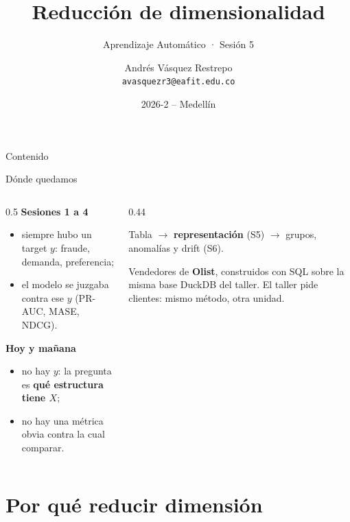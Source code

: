 \documentclass[aspectratio=169,12pt]{beamer}
\title[Reducción de dimensionalidad]{Reducción de dimensionalidad}
\subtitle{Aprendizaje Automático · Sesión 5}
\author[Aprendizaje Automático]{Andrés Vásquez Restrepo\\[2pt]{\normalfont\small\texttt{avasquezr3@eafit.edu.co}}}
\institute{SI7009 - 1 (5553)\\Universidad EAFIT}
\date{2026-2 -- Medellín}
\newcommand{\colhead}[1]{\textbf{#1}\par\vspace{2pt}}
\begin{document}
\titleframe
\addtocounter{framenumber}{1}

\begin{frame}{Contenido}
  \tableofcontents
\end{frame}

\begin{frame}{Dónde quedamos}
  \begin{columns}[T]
    \begin{column}{0.5\textwidth}
      \colhead{Sesiones 1 a 4}
      \small
      \begin{itemize}
        \item siempre hubo un target $y$: fraude, demanda, preferencia;
        \item el modelo se juzgaba contra ese $y$ (PR-AUC, MASE, NDCG).
      \end{itemize}
      \vspace{4pt}
      \colhead{Hoy y mañana}
      \begin{itemize}
        \item no hay $y$: la pregunta es \textbf{qué estructura tiene $X$};
        \item no hay una métrica obvia contra la cual comparar.
      \end{itemize}
    \end{column}
    \begin{column}{0.44\textwidth}
      \begin{keybox}[Unidad 3]
        \small Tabla $\rightarrow$ \textbf{representación} (S5) $\rightarrow$ grupos, anomalías y drift (S6).
      \end{keybox}
      \begin{notebox}
        \small Vendedores de \textbf{Olist}, construidos con SQL sobre la misma base DuckDB del taller. El taller pide clientes: mismo método, otra unidad.
      \end{notebox}
    \end{column}
  \end{columns}
\end{frame}

\section{Por qué reducir dimensión}
\end{document}
